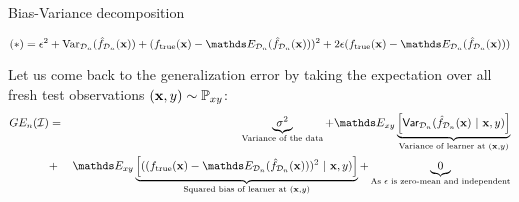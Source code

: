 \documentclass[11pt,compress,t,notes=noshow, xcolor=table]{beamer}
\begin{document}
\begin{frame}{Bias-Variance decomposition}

{\footnotesize
$$
(*) = \epsilon^2 + \text{Var}_{\D_n}(\fh_{\D_n}(\xv)) + 
  (\ftrue(\xv) - \E_{\D_n}(\fh_{\D_n}(\xv)))^2
 +2 \epsilon (\ftrue(\xv) - \E_{\D_n}(\fh_{\D_n}(\xv)))
$$
}

\vfill 

Let us come back to the generalization error by taking the expectation over all fresh test observations $(\mathbf{x}, y) \sim \mathbb{P}_{xy}$: 
\vfill
{\footnotesize
\begin{eqnarray*}
GE_n(\ind) 
  &=& \underbrace{\sigma^2}_{\text{Variance of the data}} + \E_{xy}\underbrace{\left[\var_{\D_n}(\fh_{\D_n}(\xv) ~|~\xv, y)\right]}_{\text{Variance of learner at } (\xv, y)} \\ &+& \E_{xy}\underbrace{\left[((\ftrue(\xv)-\E_{\D_n}(\fh_{\D_n}(\xv)))^2~|~\xv, y)\right]}_{\text{Squared bias of learner at } (\xv, y)} + \underbrace{0}_{\text{As $\epsilon$ is zero-mean and independent}}
\end{eqnarray*}
}



\end{frame}



\endlecture
\end{document}
